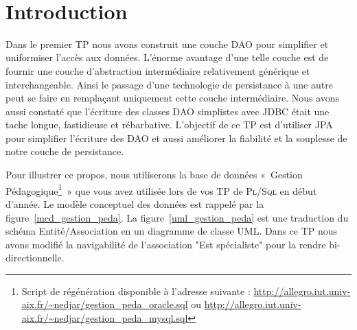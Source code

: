 \documentclass[a4paper,11pt]{article}
\date{}
\begin{document}

\newlength{\niveauZero}
\newlength{\niveauUn}
\newlength{\niveauDeux}
\newlength{\niveauTrois}
\newlength{\niveauQuatre}
\newlength{\niveauCinq}

\newlength{\colonneZero}
\newlength{\colonneUn}
\newlength{\colonneDeux}
\newlength{\colonneTrois}
\newlength{\colonneQuatre}
\newlength{\colonneCinq}


{\centering
    \mbox{
    }
}\\[0.4cm]
\section{Introduction}

Dans le premier TP nous avons construit une couche DAO pour simplifier et uniformiser l'accès aux données. L'énorme 
avantage d'une telle couche est de fournir une couche d'abstraction intermédiaire relativement générique et 
interchangeable. Ainsi le passage d'une technologie de persistance à une autre peut se faire en remplaçant uniquement 
cette couche intermédiaire. Nous avons aussi constaté que l'écriture des classes DAO simplistes avec JDBC était une tache 
longue, fastidieuse et rébarbative. L'objectif de ce TP est d'utiliser JPA pour simplifier l'écriture des DAO et aussi 
améliorer la fiabilité et la souplesse de notre couche de persistance. 

Pour illustrer ce propos, nous utiliserons la base de données «~Gestion Pédagogique\footnote{Script de régénération disponible 
à l'adresse suivante : \url{http://allegro.iut.univ-aix.fr/~nedjar/gestion_peda_oracle.sql} ou 
\url{http://allegro.iut.univ-aix.fr/~nedjar/gestion_peda_mysql.sql}}~» que vous avez utilisée lors de vos TP de \textsc{Pl/Sql} 
en début d'année. Le modèle conceptuel des données est rappelé par la figure~\ref{mcd_gestion_peda}. La figure~\ref{uml_gestion_peda} 
est une traduction du schéma Entité/Association en un  diagramme de classe UML. Dans ce TP nous avons modifié la 
navigabilité de l'association "Est spécialiste" pour la rendre bi-directionnelle.
\end{document}
